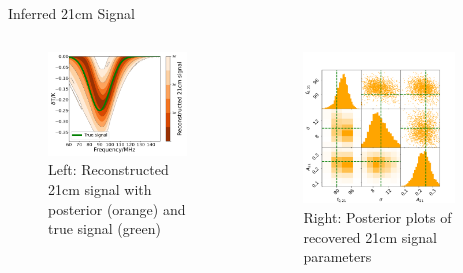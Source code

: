 \documentclass[aspectratio=169]{beamer}
\begin{document}
\begin{frame}{\small{Inferred 21cm Signal}}
	\begin{columns}
		\begin{column}{0.48\textwidth}
			\begin{figure}
				\centering
				\includegraphics[width=0.9\textwidth]{images/signal_comparison.pdf}
				\caption{\tiny Left: Reconstructed 21cm signal with posterior (orange) and true signal (green)}
			\end{figure}
		\end{column}
		\begin{column}{0.48\textwidth}
			\begin{figure}
				\centering
				\includegraphics[width=0.9\textwidth]{images/signal_triangle_plot.pdf}
				\caption{\tiny Right: Posterior plots of recovered 21cm signal parameters}
			\end{figure}
		\end{column}
	\end{columns}
\end{frame}
\end{document}
